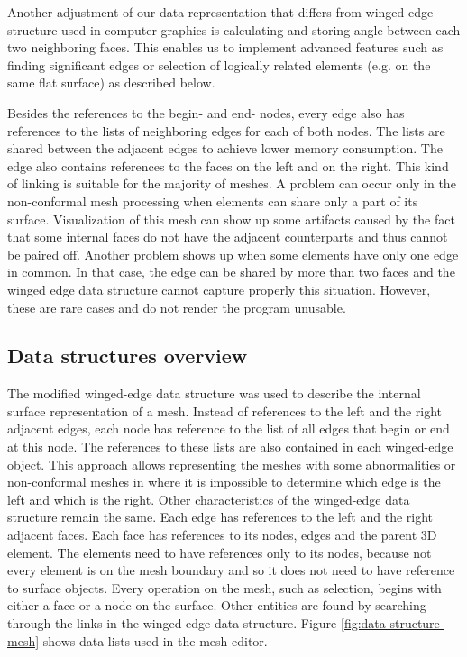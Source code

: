 Another adjustment of our data representation that differs from winged edge structure used in computer graphics is calculating and storing angle between each two neighboring faces. This enables us to implement advanced features such as finding significant edges or selection of logically related elements (e.g. on the same flat surface) as described below.

Besides the references to the begin- and end- nodes, every edge also has references to the lists of neighboring edges for each of both nodes. The lists are shared between the adjacent edges to achieve lower memory consumption. The edge also contains references to the faces on the left and on the right. This kind of linking is suitable for the majority of meshes. A problem can occur only in the non-conformal mesh processing when elements can share only a part of its surface. Visualization of this mesh can show up some artifacts caused by the fact that some internal faces do not have the adjacent counterparts and thus cannot be paired off. Another problem shows up when some elements have only one edge in common. In that case, the edge can be shared by more than two faces and the winged edge data structure cannot capture properly this situation. However, these are rare cases and do not render the program unusable.


\subsection{Data structures overview}

The modified winged-edge data structure was used to describe the internal surface representation of a mesh. Instead of references to the left and the right adjacent edges, each node has reference to the list of all edges that begin or end at this node. The references to these lists are also contained in each winged-edge object. This approach allows representing the meshes with some abnormalities or non-conformal meshes in where it is impossible to determine which edge is the left and which is the right. Other characteristics of the winged-edge data structure remain the same. Each edge has references to the left and the right adjacent faces. Each face has references to its nodes, edges and the parent 3D element. The elements need to have references only to its nodes, because not every element is on the mesh boundary and so it does not need to have reference to surface objects. Every operation on the mesh, such as selection, begins with either a face or a node on the surface. Other entities are found by searching through the links in the winged edge data structure. Figure \ref{fig:data-structure-mesh} shows data lists used in the mesh editor.

